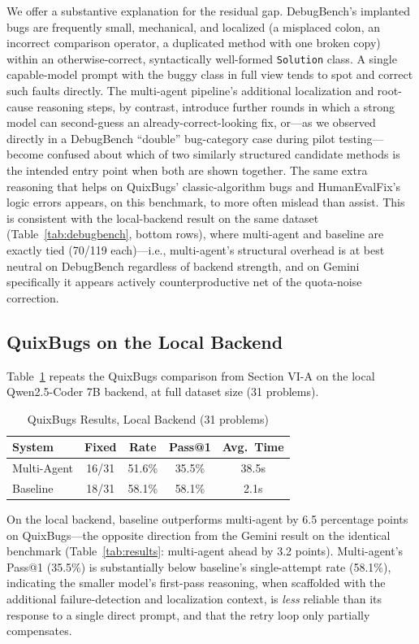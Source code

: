 \documentclass[conference]{IEEEtran}
\begin{document}
We offer a substantive explanation for the residual gap. DebugBench's implanted bugs are frequently small, mechanical, and localized (a misplaced colon, an incorrect comparison operator, a duplicated method with one broken copy) within an otherwise-correct, syntactically well-formed \texttt{Solution} class. A single capable-model prompt with the buggy class in full view tends to spot and correct such faults directly. The multi-agent pipeline's additional localization and root-cause reasoning steps, by contrast, introduce further rounds in which a strong model can second-guess an already-correct-looking fix, or---as we observed directly in a DebugBench ``double'' bug-category case during pilot testing---become confused about which of two similarly structured candidate methods is the intended entry point when both are shown together. The same extra reasoning that helps on QuixBugs' classic-algorithm bugs and HumanEvalFix's logic errors appears, on this benchmark, to more often mislead than assist. This is consistent with the local-backend result on the same dataset (Table~\ref{tab:debugbench}, bottom rows), where multi-agent and baseline are exactly tied (70/119 each)---i.e., multi-agent's structural overhead is at best neutral on DebugBench regardless of backend strength, and on Gemini specifically it appears actively counterproductive net of the quota-noise correction.

\subsection{QuixBugs on the Local Backend}
Table~\ref{tab:quixbugslocal} repeats the QuixBugs comparison from Section VI-A on the local Qwen2.5-Coder 7B backend, at full dataset size (31 problems).

\begin{table}[htbp]
\caption{QuixBugs Results, Local Backend (31 problems)}
\label{tab:quixbugslocal}
\centering
\small
\begin{tabular}{lcccc}
\toprule
\textbf{System} & \textbf{Fixed} & \textbf{Rate} & \textbf{Pass@1} & \textbf{Avg.\ Time} \\
\midrule
Multi-Agent & 16/31 & 51.6\% & 35.5\% & 38.5s \\
Baseline & 18/31 & 58.1\% & 58.1\% & 2.1s \\
\bottomrule
\end{tabular}
\end{table}

On the local backend, baseline outperforms multi-agent by 6.5 percentage points on QuixBugs---the opposite direction from the Gemini result on the identical benchmark (Table~\ref{tab:results}: multi-agent ahead by 3.2 points). Multi-agent's Pass@1 (35.5\%) is substantially below baseline's single-attempt rate (58.1\%), indicating the smaller model's first-pass reasoning, when scaffolded with the additional failure-detection and localization context, is \emph{less} reliable than its response to a single direct prompt, and that the retry loop only partially compensates.
\end{document}
